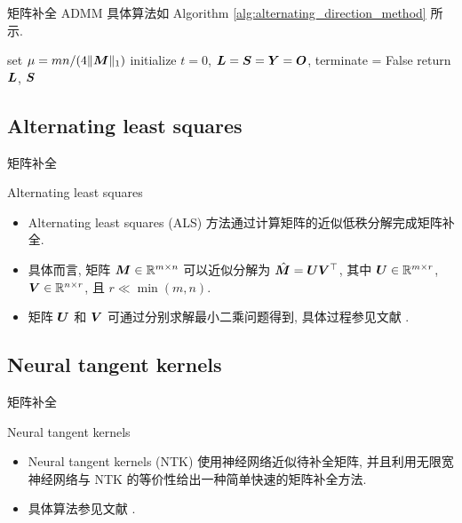 \documentclass{beamer}
\begin{document}
\begin{frame}{矩阵补全}
  ADMM 具体算法如 Algorithm \ref{alg:alternating_direction_method} 所示.

  \begin{algorithm}[H]
    \small
    \label{alg:alternating_direction_method}
    \caption{Alternating direction method for matrix completion.}
    set $\mu=mn/(4\|\bm{M}\|_1)$\;
    initialize $t=0$, $\bm{L}=\bm{S}=\bm{Y}=\bm{O}$, terminate = False\;
    return $\bm{L}$, $\bm{S}$\;
  \end{algorithm}
\end{frame}

\subsection{Alternating least squares}

\begin{frame}{矩阵补全}
  \begin{block}{Alternating least squares}
    \begin{itemize}
      \item Alternating least squares (ALS) \cite{mnih2007probabilistic,paterek2007improving,hu2008collaborative} 方法通过计算矩阵的近似低秩分解完成矩阵补全.
      \item 具体而言, 矩阵 $\bm{M}\in\mathbb{R}^{m\times n}$ 可以近似分解为 $\hat{\bm{M}}=\bm{U}\bm{V}^\top$, 其中 $\bm{U}\in\mathbb{R}^{m\times r}$, $\bm{V}\in\mathbb{R}^{n\times r}$, 且 $r\ll \min(m,n)$.
      \item 矩阵 $\bm{U}$ 和 $\bm{V}$ 可通过分别求解最小二乘问题得到, 具体过程参见文献 \cite{hu2008collaborative}.
    \end{itemize}
  \end{block}
\end{frame}

\subsection{Neural tangent kernels}

\begin{frame}{矩阵补全}
  \begin{block}{Neural tangent kernels}
    \begin{itemize}
      \item Neural tangent kernels (NTK) \cite{radhakrishnan2022simple} 使用神经网络近似待补全矩阵, 并且利用无限宽神经网络与 NTK 的等价性给出一种简单快速的矩阵补全方法.
      \item 具体算法参见文献 \cite{radhakrishnan2022simple}.
    \end{itemize}
  \end{block}
\end{frame}
\end{document}

